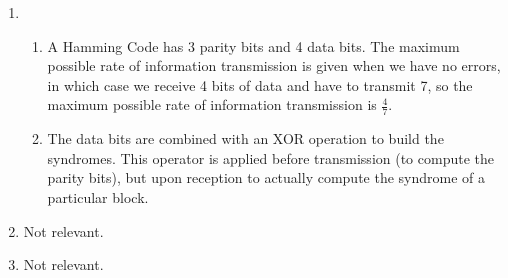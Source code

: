 


\begin{enumerate}[label=(\alph*)]
  \item
    \begin{enumerate}[label=(\roman*)]

      \item

        A Hamming Code has 3 parity bits and 4 data bits. The maximum possible rate of information transmission is given when we have no errors, in which case we receive 4 bits of data and have to transmit 7, so the maximum possible rate of information transmission is $\frac{4}{7}$.

      \item
        The data bits are combined with an XOR operation to build the syndromes. This operator is applied before transmission (to compute the parity bits), but upon reception to actually compute the syndrome of a particular block.
        
    \end{enumerate}

  \item
    Not relevant.

  \item
    Not relevant.
        
\end{enumerate}

